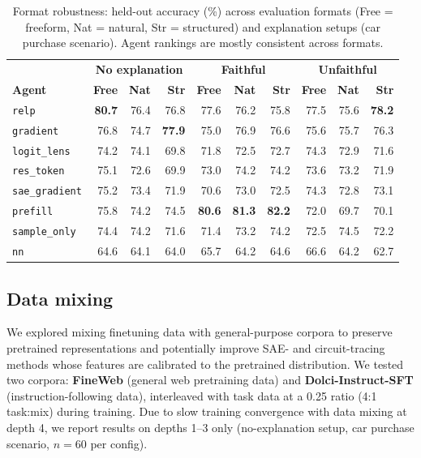 \documentclass{article} %
\begin{document}
\begin{table}[h]
\small\centering
\begin{tabular}{@{}l rrr | rrr | rrr@{}}
\toprule
 & \multicolumn{3}{c|}{\textbf{No explanation}} & \multicolumn{3}{c|}{\textbf{Faithful}} & \multicolumn{3}{c}{\textbf{Unfaithful}} \\
\textbf{Agent} & \textbf{Free} & \textbf{Nat} & \textbf{Str} & \textbf{Free} & \textbf{Nat} & \textbf{Str} & \textbf{Free} & \textbf{Nat} & \textbf{Str} \\
\midrule
\rowcolor{gradrow}
\texttt{relp} & \textbf{80.7} & 76.4 & 76.8 & 77.6 & 76.2 & 75.8 & 77.5 & 75.6 & \textbf{78.2} \\
\rowcolor{gradrow}
\texttt{gradient} & 76.8 & 74.7 & \textbf{77.9} & 75.0 & 76.9 & 76.6 & 75.6 & 75.7 & 76.3 \\[2pt]
\texttt{logit\_lens} & 74.2 & 74.1 & 69.8 & 71.8 & 72.5 & 72.7 & 74.3 & 72.9 & 71.6 \\
\texttt{res\_token} & 75.1 & 72.6 & 69.9 & 73.0 & 74.2 & 74.2 & 73.6 & 73.2 & 71.9 \\
\texttt{sae\_gradient} & 75.2 & 73.4 & 71.9 & 70.6 & 73.0 & 72.5 & 74.3 & 72.8 & 73.1 \\[2pt]
\texttt{prefill} & 75.8 & 74.2 & 74.5 & \textbf{80.6} & \textbf{81.3} & \textbf{82.2} & 72.0 & 69.7 & 70.1 \\
\texttt{sample\_only} & 74.4 & 74.2 & 71.6 & 71.4 & 73.2 & 74.2 & 72.5 & 74.5 & 72.2 \\[2pt]
\texttt{nn} & 64.6 & 64.1 & 64.0 & 65.7 & 64.2 & 64.6 & 66.6 & 64.2 & 62.7 \\
\bottomrule
\end{tabular}
\caption{Format robustness: held-out accuracy (\%) across evaluation formats (Free = freeform, Nat = natural, Str = structured) and explanation setups (car purchase scenario). Agent rankings are mostly consistent across formats.}
\label{tab:format_robustness}
\end{table}

\subsection{Data mixing}
\label{app:mixing}
We explored mixing finetuning data with general-purpose corpora to preserve pretrained representations and potentially improve SAE- and circuit-tracing methods whose features are calibrated to the pretrained distribution.
We tested two corpora: \textbf{FineWeb} (general web pretraining data) and \textbf{Dolci-Instruct-SFT} (instruction-following data), interleaved with task data at a 0.25 ratio (4:1 task:mix) during training.
Due to slow training convergence with data mixing at depth 4, we report results on depths 1--3 only (no-explanation setup, car purchase scenario, $n{=}60$ per config).
\end{document}
